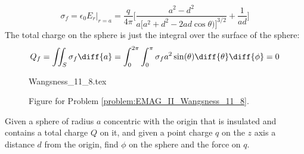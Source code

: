\begin{solution}
\begin{equation}
                        \sigma_{f}=\epsilon_{0}E_{r}\Big|_{r=a}
                        =\frac{q}{4\pi}\Big[
                            \frac{a^{2}-d^{2}}
                                {a[a^{2}+d^{2}-2ad\cos{\theta)]^{3/2}}}
                                +\frac{1}{ad}\Big]
                    \end{equation}
                    The total charge on the sphere is just the integral
                    over the surface of the sphere:
                    \begin{equation}
                        Q_{f}=\iint_{S}\sigma_{f}\diff{a}
                        =\int_{0}^{2\pi}\int_{0}^{\pi}
                            \sigma_{f}a^{2}\sin(\theta)
                            \diff{\theta}\diff{\phi}=0
                    \end{equation}
                \end{solution}
                \begin{figure}[H]
                    \centering
                    \captionsetup{type=figure}
                    {Wangsness_11_8.tex}
                    \caption{Figure for Problem
                             \ref{problem:EMAG_II_Wangsness_11_8}.}
                    \label{fig:EMAG_II_Wangsness_11_8}
                \end{figure}
                \begin{problem}
                    Given a sphere of radius $a$ concentric with the
                    origin that is insulated and contains a total charge
                    $Q$ on it, and given a point charge $q$ on the
                    $z$ axis a distance $d$ from the origin, find
                    $\phi$ on the sphere and the force on $q$.
                \end{problem}
